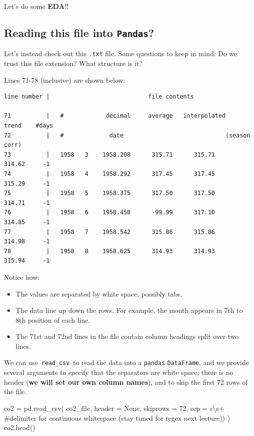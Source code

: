 \documentclass[
  letterpaper,
  DIV=11,
  numbers=noendperiod]{scrreprt}
\newenvironment{Shaded}{\begin{snugshade}}{\end{snugshade}}
\newcommand{\CommentTok}[1]{\textcolor[rgb]{0.37,0.37,0.37}{#1}}
\newcommand{\DecValTok}[1]{\textcolor[rgb]{0.68,0.00,0.00}{#1}}
\newcommand{\NormalTok}[1]{\textcolor[rgb]{0.00,0.23,0.31}{#1}}
\newcommand{\OperatorTok}[1]{\textcolor[rgb]{0.37,0.37,0.37}{#1}}
\newcommand{\VariableTok}[1]{\textcolor[rgb]{0.07,0.07,0.07}{#1}}
\newcommand{\VerbatimStringTok}[1]{\textcolor[rgb]{0.13,0.47,0.30}{#1}}
\providecommand{\tightlist}{%
  \setlength{\itemsep}{0pt}\setlength{\parskip}{0pt}}\usepackage{longtable,booktabs,array}
\begin{document}
Let's do some \textbf{EDA}!!

\subsection{\texorpdfstring{Reading this file into
\texttt{Pandas}?}{Reading this file into Pandas?}}\label{reading-this-file-into-pandas}

Let's instead check out this \texttt{.txt} file. Some questions to keep
in mind: Do we trust this file extension? What structure is it?

Lines 71-78 (inclusive) are shown below:

\begin{verbatim}
line number |                            file contents

71          |   #            decimal     average   interpolated    trend    #days
72          |   #             date                             (season corr)
73          |   1958   3    1958.208      315.71      315.71      314.62     -1
74          |   1958   4    1958.292      317.45      317.45      315.29     -1
75          |   1958   5    1958.375      317.50      317.50      314.71     -1
76          |   1958   6    1958.458      -99.99      317.10      314.85     -1
77          |   1958   7    1958.542      315.86      315.86      314.98     -1
78          |   1958   8    1958.625      314.93      314.93      315.94     -1
\end{verbatim}

Notice how:

\begin{itemize}
\tightlist
\item
  The values are separated by white space, possibly tabs.
\item
  The data line up down the rows. For example, the month appears in 7th
  to 8th position of each line.
\item
  The 71st and 72nd lines in the file contain column headings split over
  two lines.
\end{itemize}

We can use~\texttt{read\_csv}~to read the data into a \texttt{pandas}
\texttt{DataFrame}, and we provide several arguments to specify that the
separators are white space, there is no header (\textbf{we will set our
own column names}), and to skip the first 72 rows of the file.

\begin{Shaded}
\begin{Highlighting}[]
\NormalTok{co2 }\OperatorTok{=}\NormalTok{ pd.read\_csv(}
\NormalTok{    co2\_file, header }\OperatorTok{=} \VariableTok{None}\NormalTok{, skiprows }\OperatorTok{=} \DecValTok{72}\NormalTok{,}
\NormalTok{    sep }\OperatorTok{=} \VerbatimStringTok{r\textquotesingle{}\textbackslash{}s+\textquotesingle{}}       \CommentTok{\#delimiter for continuous whitespace (stay tuned for regex next lecture))}
\NormalTok{)}
\NormalTok{co2.head()}
\end{Highlighting}
\end{Shaded}
\end{document}

